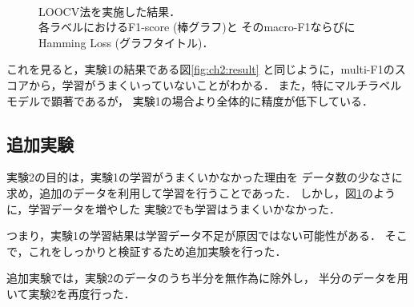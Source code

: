\begin{figure}[p]
  \centering
  \\
  \caption{LOOCV法を実施した結果．\\
各ラベルにおけるF1-score (棒グラフ)と
  そのmacro-F1ならびにHamming Loss (グラフタイトル)．
 }
  \label{fig:ch3:result}
\end{figure}

これを見ると，実験1の結果である図\ref{fig:ch2:result}
と同じように，multi-F1のスコアから，学習がうまくいっていないことがわかる．
また，特にマルチラベルモデルで顕著であるが，
実験1の場合より全体的に精度が低下している．

\subsection{追加実験}
実験2の目的は，実験1の学習がうまくいかなかった理由を
データ数の少なさに求め，追加のデータを利用して学習を行うことであった．
しかし，図\ref{fig:ch3:result}のように，学習データを増やした
実験2でも学習はうまくいかなかった．

つまり，実験1の学習結果は学習データ不足が原因ではない可能性がある．
そこで，これをしっかりと検証するため追加実験を行った．

追加実験では，実験2のデータのうち半分を無作為に除外し，
半分のデータを用いて実験2を再度行った．

